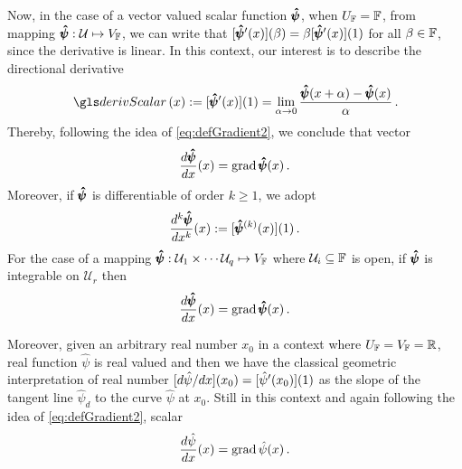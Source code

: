 Now, in the case of a vector valued scalar function $\pmb{\hat{\psi}}$, when $U_{\mathbb{F}}=\mathbb{F}$, from mapping $\pmb{\hat{\psi}} : \mathcal{U} \mapsto V_{\mathbb{F}}$, we can write that $[\pmb{\hat{\psi}}'(x)](\beta) = \beta[\pmb{\hat{\psi}}'(x)](1)$ for all $\beta\in\mathbb{F}$, since the derivative is linear. In this context, our interest is to describe the directional derivative  
\begin{equation}\label{eq:derivVecScaFun}
\fua{\gloref{derivScalar}}{x} := \fua{[\tnr{\hat{\psi}}'(x)]}{1} = \lim_{\alpha\to 0} \dfrac{\fua{\tnr{\hat{\psi}}}{x+\alpha}-\fua{\tnr{\hat{\psi}}}{x}}{\alpha}\,. 
\end{equation} 
Thereby, following the idea of \eqref{eq:defGradient2}, we conclude that vector
\begin{equation}\label{eq:gradvectFun}
\dfrac{d\pmb{\hat{\psi}}}{dx}(x) = \operatorname{grad}{\pmb{\hat{\psi}}}(x) \,.
\end{equation}
Moreover, if $\pmb{\hat{\psi}}$ is differentiable of order $k\geqslant 1$, we adopt  
\begin{equation}
\dfrac{d^k\pmb{\hat{\psi}}}{dx^k}(x):=[\pmb{\hat{\psi}}^{(k)}(x)](1)\,.
\end{equation} 
For the case of a mapping $\pmb{\hat{\psi}} : \mathcal{U}_1\times\cdots\mathcal{U}_q \mapsto V_{\mathbb{F}}$ where $\mathcal{U}_i\subseteq\mathbb{F}$ is open, if $\pmb{\hat{\psi}}$ is integrable on $\mathcal{U}_r$ then 
\begin{equation}\label{eq:gradvectFun}
\dfrac{d\pmb{\hat{\psi}}}{dx}(x) = \operatorname{grad}{\pmb{\hat{\psi}}}(x) \,.
\end{equation}

Moreover, given an arbitrary real number $x_0$ in a context where $U_{\mathbb{F}}=V_{\mathbb{F}}=\mathbb{R}$, real function $\hat{\psi}$ is real valued and then we have the classical geometric interpretation of real number $[d{\hat{\psi}}/dx](x_0)=[{\hat{\psi}}'(x_0)](1)$ as the slope of the tangent line ${\hat{\psi}}_\mathit{d}$ to the curve ${\hat{\psi}}$ at $x_0$. Still in this context and again following the idea of \eqref{eq:defGradient2}, scalar
\begin{equation}
\dfrac{d{\hat{\psi}}}{dx}(x)=\operatorname{grad}{{\hat{\psi}}(x)}\,.
\end{equation}

